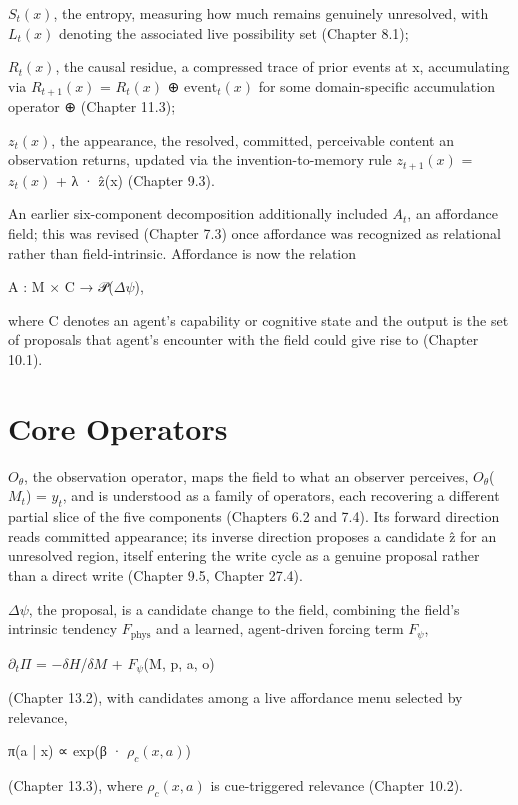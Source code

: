 \(S_t(x)\), the entropy, measuring how much remains genuinely unresolved, with \(L_t(x)\) denoting the associated live possibility set (Chapter 8.1);

\(R_t(x)\), the causal residue, a compressed trace of prior events at x, accumulating via \(R_{t+1}(x)\) = \(R_t(x)\) ⊕ \(\mathrm{event}_t(x)\) for some domain-specific accumulation operator ⊕ (Chapter 11.3);

\(z_t(x)\), the appearance, the resolved, committed, perceivable content an observation returns, updated via the invention-to-memory rule \(z_{t+1}(x)\) = \(z_t(x)\) + λ · ẑ(x) (Chapter 9.3).

An earlier six-component decomposition additionally included \(A_t\), an affordance field; this was revised (Chapter 7.3) once affordance was recognized as relational rather than field-intrinsic. Affordance is now the relation

A : M × C → 𝒫(\(\Delta\psi\)),

where C denotes an agent's capability or cognitive state and the output is the set of proposals that agent's encounter with the field could give rise to (Chapter 10.1).

\section{Core Operators}

\(O_\theta\), the observation operator, maps the field to what an observer perceives, \(O_\theta\)(\(M_t\)) = \(y_t\), and is understood as a family of operators, each recovering a different partial slice of the five components (Chapters 6.2 and 7.4). Its forward direction reads committed appearance; its inverse direction proposes a candidate ẑ for an unresolved region, itself entering the write cycle as a genuine proposal rather than a direct write (Chapter 9.5, Chapter 27.4).

\(\Delta\psi\), the proposal, is a candidate change to the field, combining the field's intrinsic tendency \(F_{\mathrm{phys}}\) and a learned, agent-driven forcing term \(F_\psi\),

\(\partial_t \Pi\) = −\(\delta H\)/\(\delta M\) + \(F_\psi\)(M, p, a, o)

(Chapter 13.2), with candidates among a live affordance menu selected by relevance,

π(a | x) ∝ exp(β · \(\rho_c(x,a)\))

(Chapter 13.3), where \(\rho_c(x,a)\) is cue-triggered relevance (Chapter 10.2).

